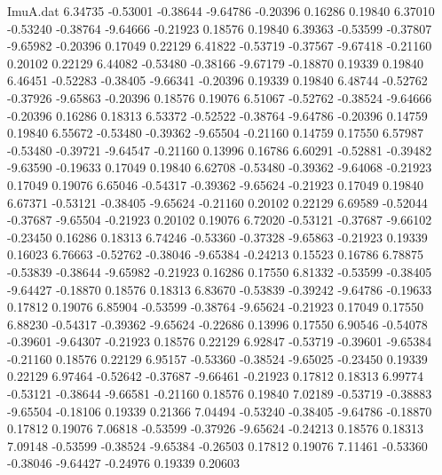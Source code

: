 \begin{filecontents}{ImuA.dat}
   6.34735   -0.53001   -0.38644   -9.64786   -0.20396    0.16286    0.19840
   6.37010   -0.53240   -0.38764   -9.64666   -0.21923    0.18576    0.19840
   6.39363   -0.53599   -0.37807   -9.65982   -0.20396    0.17049    0.22129
   6.41822   -0.53719   -0.37567   -9.67418   -0.21160    0.20102    0.22129
   6.44082   -0.53480   -0.38166   -9.67179   -0.18870    0.19339    0.19840
   6.46451   -0.52283   -0.38405   -9.66341   -0.20396    0.19339    0.19840
   6.48744   -0.52762   -0.37926   -9.65863   -0.20396    0.18576    0.19076
   6.51067   -0.52762   -0.38524   -9.64666   -0.20396    0.16286    0.18313
   6.53372   -0.52522   -0.38764   -9.64786   -0.20396    0.14759    0.19840
   6.55672   -0.53480   -0.39362   -9.65504   -0.21160    0.14759    0.17550
   6.57987   -0.53480   -0.39721   -9.64547   -0.21160    0.13996    0.16786
   6.60291   -0.52881   -0.39482   -9.63590   -0.19633    0.17049    0.19840
   6.62708   -0.53480   -0.39362   -9.64068   -0.21923    0.17049    0.19076
   6.65046   -0.54317   -0.39362   -9.65624   -0.21923    0.17049    0.19840
   6.67371   -0.53121   -0.38405   -9.65624   -0.21160    0.20102    0.22129
   6.69589   -0.52044   -0.37687   -9.65504   -0.21923    0.20102    0.19076
   6.72020   -0.53121   -0.37687   -9.66102   -0.23450    0.16286    0.18313
   6.74246   -0.53360   -0.37328   -9.65863   -0.21923    0.19339    0.16023
   6.76663   -0.52762   -0.38046   -9.65384   -0.24213    0.15523    0.16786
   6.78875   -0.53839   -0.38644   -9.65982   -0.21923    0.16286    0.17550
   6.81332   -0.53599   -0.38405   -9.64427   -0.18870    0.18576    0.18313
   6.83670   -0.53839   -0.39242   -9.64786   -0.19633    0.17812    0.19076
   6.85904   -0.53599   -0.38764   -9.65624   -0.21923    0.17049    0.17550
   6.88230   -0.54317   -0.39362   -9.65624   -0.22686    0.13996    0.17550
   6.90546   -0.54078   -0.39601   -9.64307   -0.21923    0.18576    0.22129
   6.92847   -0.53719   -0.39601   -9.65384   -0.21160    0.18576    0.22129
   6.95157   -0.53360   -0.38524   -9.65025   -0.23450    0.19339    0.22129
   6.97464   -0.52642   -0.37687   -9.66461   -0.21923    0.17812    0.18313
   6.99774   -0.53121   -0.38644   -9.66581   -0.21160    0.18576    0.19840
   7.02189   -0.53719   -0.38883   -9.65504   -0.18106    0.19339    0.21366
   7.04494   -0.53240   -0.38405   -9.64786   -0.18870    0.17812    0.19076
   7.06818   -0.53599   -0.37926   -9.65624   -0.24213    0.18576    0.18313
   7.09148   -0.53599   -0.38524   -9.65384   -0.26503    0.17812    0.19076
   7.11461   -0.53360   -0.38046   -9.64427   -0.24976    0.19339    0.20603

\end{filecontents}
